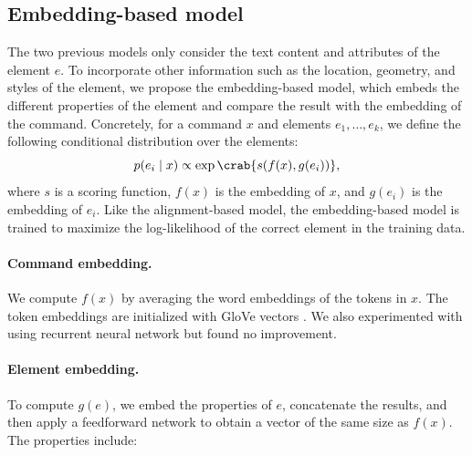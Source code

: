 \subsection{Embedding-based model}

The two previous models only consider the text content
and attributes of the element $e$.
To incorporate other information such as the location,
geometry, and styles of the element,
we propose the embedding-based model,
which embeds the different properties of the element
and compare the result with the embedding of the command.
Concretely,
for a command $x$ and elements $e_1, \dots, e_k$,
we define the following conditional distribution
over the elements:
\begin{equation}
p(e_i \mid x) \propto \exp\crab{s(f(x), g(e_i))},
\label{eqn:webrep-prob}
\end{equation}
where $s$ is a scoring function,
$f(x)$ is the embedding of $x$,
and $g(e_i)$ is the embedding of $e_i$.
Like the alignment-based model,
the embedding-based model is trained to maximize the log-likelihood
of the correct element in the training data.

\paragraph{Command embedding.}
We compute $f(x)$ by averaging the word embeddings
of the tokens in $x$.
The token embeddings are initialized with GloVe vectors
\cite{pennington2014glove}.
We also experimented with using recurrent neural network
but found no improvement.

\paragraph{Element embedding.}
To compute $g(e)$, we embed the properties of $e$,
concatenate the results, and then apply a feedforward
network to obtain a vector of the same size as $f(x)$.
The properties include:

